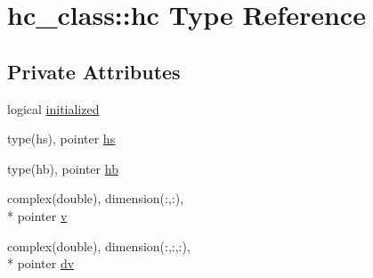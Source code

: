 \hypertarget{structhc__class_1_1hc}{\section{hc\+\_\+class\+:\+:hc Type Reference}
\label{structhc__class_1_1hc}
}
\subsection*{Private Attributes}
\begin{DoxyCompactItemize}
\item 
logical \hyperlink{structhc__class_1_1hc_a89151c80172cb67d68a44b6264afb8a7}{initialized}
\item 
type(hs), pointer \hyperlink{structhc__class_1_1hc_a09dd08ce79ada0e7a9f7c3eb8a2a50f5}{hs}
\item 
type(hb), pointer \hyperlink{structhc__class_1_1hc_a87af1d9489543e7f6a7501ea8468f763}{hb}
\item 
complex(double), dimension(\+:,\+:), \\*
pointer \hyperlink{structhc__class_1_1hc_ad3bab6b18bd729b4e1c49f7d14c0b4f9}{v}
\item 
complex(double), dimension(\+:,\+:,\+:), \\*
pointer \hyperlink{structhc__class_1_1hc_ae44fb8b1351b045650148c174099a1a1}{dv}
\end{DoxyCompactItemize}


